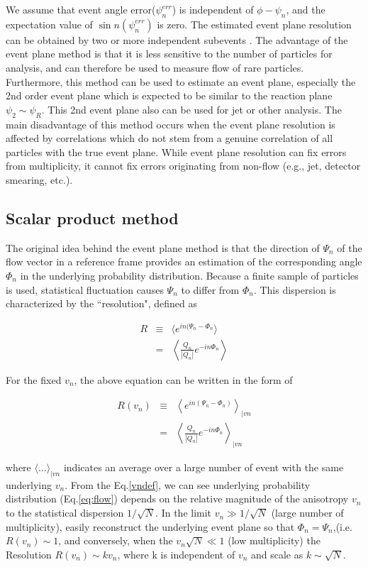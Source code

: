 We assume that event angle error($\psi_n^{err}$) is independent of $\phi-\psi_n$, and the expectation value of $\sin{n(\psi_n^{err})}$ is zero. The estimated event plane resolution can be obtained by two or more independent subevents \cite{PhysRevC.58.1671}. The advantage of the event plane method is that it is less sensitive to the number of particles for analysis, and can therefore be used to measure flow of rare particles. Furthermore, this method can be used to estimate an event plane, especially the 2nd order event plane which is expected to be similar to the reaction plane $\psi_2 \sim \psi_R$. This 2nd event plane also can be used for jet or other analysis. The main disadvantage of this method occurs when the event plane resolution is affected by correlations which do not stem from a genuine correlation of all particles with the true event plane. While event plane resolution can fix errors from multiplicity, it cannot fix errors originating from non-flow (e.g., jet, detector smearing, etc.). 

\subsection{Scalar product method}

	The original idea behind the event plane method is that the direction of $\Psi_n$ of the flow vector in a reference frame provides an estimation of the corresponding angle $\Phi_n$ in the underlying probability distribution. Because a finite sample of particles is used, statistical fluctuation causes $\Psi_n$ to differ from $\Phi_n$. This dispersion is characterized by the ``resolution", defined as
	
	\begin{eqnarray}
		R &\equiv & \langle e^{in(\Psi_n - \Phi_n} \rangle  \\
			&=& \left\langle \frac{Q_n}{|Q_n|} e^{-in\Phi_n} \right\rangle 
	\end{eqnarray}

	For the fixed $v_n$, the above equation can be written in the form of
	
	\begin{eqnarray}
		R(v_n) &\equiv &  \left\langle e^{in(\Psi_n - \Phi_n)} \right\rangle _{|vn} \\ 
		&=& \left\langle \frac{Q_n}{|Q_n|} e^{-in\Phi_n} \right\rangle _{|vn} \label{eq:res_def}
	\end{eqnarray}
	
	where $\langle ... \rangle _{|vn}$ indicates an average over a large number of event with the same underlying $v_n$. From the Eq.\ref{vndef}, we can see underlying probability distribution (Eq.\ref{eq:flow}) depends on the relative magnitude of the anisotropy $v_n$ to the statistical dispersion $1/\sqrt{N}$. In the limit $v_n \gg 1/\sqrt{N}$ (large number of multiplicity), easily reconstruct the underlying event plane so that $\Phi_n = \Psi_n$,(i.e. $R(v_n) \sim 1$, and conversely, when the $v_n \sqrt{N} \ll 1$ (low multiplicity) the Resolution $R(v_n) \sim kv_n$, where k is independent of $v_n$ and scale as $k \sim \sqrt{N}$. 
	
